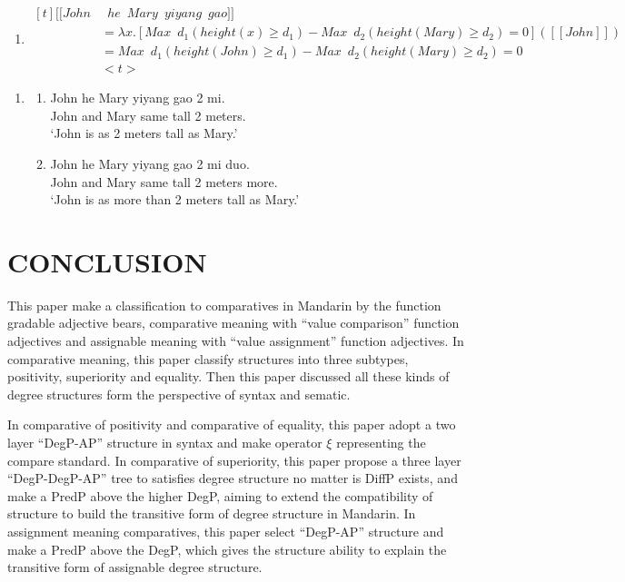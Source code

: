 \documentclass{ctexart}
\begin{document}
\begin{enumerate}
\begin{enumerate}
        \item \label{equality_example_3_d}
        $\begin{aligned}[t]
            [\![John &\enspace he \enspace Mary \enspace yiyang \enspace gao]\!] \\
            &= \lambda x.[Max \enspace d_1 (height(x) \geq d_1) - Max \enspace d_2 (height(Mary) \geq d_2) = 0]([\![John]\!]) \\
            &= Max \enspace d_1 (height(John) \geq d_1) - Max \enspace d_2 (height(Mary) \geq d_2) = 0 \\
            & <t>
        \end{aligned}$
    \end{enumerate}
\end{enumerate}

\begin{enumerate}
    \item \label{equality_example_1}
    \begin{enumerate}
        \item \label{equality_example_1_a}
        John he Mary yiyang gao 2 mi. \\
        John and Mary same tall 2 meters. \\
        `John is as 2 meters tall as Mary.'

        \item \label{equality_example_1_b}
        John he Mary yiyang gao 2 mi duo. \\
        John and Mary same tall 2 meters more. \\
        `John is as more than 2 meters tall as Mary.'
    \end{enumerate}
\end{enumerate}




\section{CONCLUSION}

This paper make a classification to comparatives in Mandarin by the function gradable adjective bears, comparative meaning with ``value comparison'' function adjectives and assignable meaning with ``value assignment'' function adjectives. In comparative meaning, this paper 
classify structures into three subtypes, positivity, superiority and equality. Then this paper discussed all these kinds of degree structures form the perspective of syntax and sematic. 

In comparative of positivity and comparative of equality, this paper adopt a two layer ``DegP-AP'' structure in syntax and make operator $\xi$ representing the compare standard. In comparative of superiority, this paper propose a three layer ``DegP-DegP-AP'' tree to satisfies degree structure no matter is DiffP exists, and make a PredP above the higher DegP, aiming to extend the compatibility of structure to build the transitive form of degree structure in Mandarin. In assignment meaning comparatives, this paper select ``DegP-AP'' structure and make a PredP above the DegP, which gives the structure ability to explain the transitive form of assignable degree structure.

\newpage

\printbibliography
\end{document}
